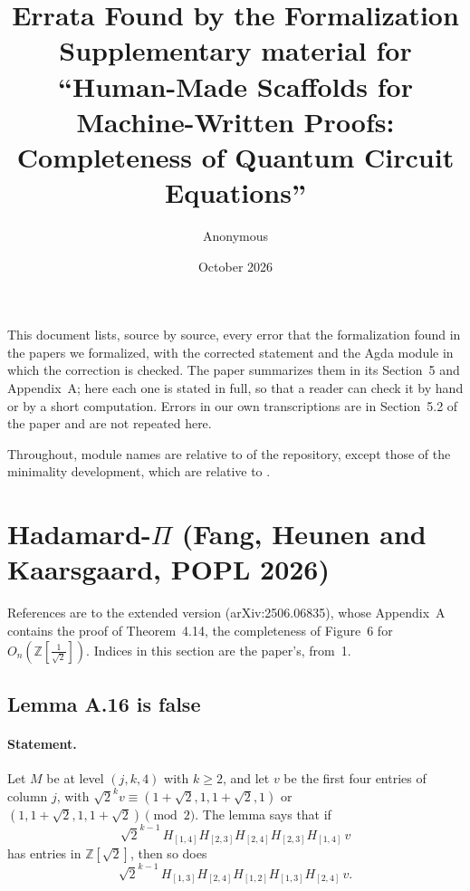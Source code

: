 \documentclass[11pt]{article}
\title{Errata Found by the Formalization\\
\large Supplementary material for ``Human-Made Scaffolds for Machine-Written
Proofs: Completeness of Quantum Circuit Equations''}
\author{Anonymous}
\date{October 2026}
\newcommand{\Z}{\mathbb{Z}}
\begin{document}
\sloppy
\maketitle

This document lists, source by source, every error that the
formalization found in the papers we formalized, with the corrected
statement and the Agda module in which the correction is checked. The
paper summarizes them in its Section~5 and Appendix~A; here each one is
stated in full, so that a reader can check it by hand or by a short
computation. Errors in our own transcriptions are in Section~5.2 of
the paper and are not repeated here.

Throughout, module names are relative to  of
the repository, except those of the minimality development, which are
relative to .

\section{Hadamard-\texorpdfstring{$\Pi$}{Pi} (Fang, Heunen and Kaarsgaard, POPL 2026)}

References are to the extended version (arXiv:2506.06835), whose
Appendix~A contains the proof of Theorem~4.14, the completeness of
Figure~6 for $O_n(\Z[\frac1{\sqrt2}])$. Indices in this section are
the paper's, from~1.

\subsection{Lemma A.16 is false}

\paragraph{Statement.} Let $M$ be at level $(j,k,4)$ with $k\ge2$, and
let $v$ be the first four entries of column $j$, with
$\sqrt2^k v \equiv (1+\sqrt2,1,1+\sqrt2,1)$ or
$(1,1+\sqrt2,1,1+\sqrt2) \pmod 2$. The lemma says that if
\[
\sqrt2^{k-1}\,H_{[1,4]}H_{[2,3]}H_{[2,4]}H_{[2,3]}H_{[1,4]}\,v
\]
has entries in $\Z[\sqrt2]$, then so does
\[
\sqrt2^{k-1}\,H_{[1,3]}H_{[2,4]}H_{[1,2]}H_{[1,3]}H_{[2,4]}\,v .
\]
\end{document}
